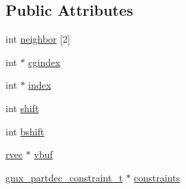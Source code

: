 \subsection*{\-Public \-Attributes}
\begin{DoxyCompactItemize}
\item 
int \hyperlink{structgmx__partdec_a5144dace85deda9f7d7708127c6b9063}{neighbor} \mbox{[}2\mbox{]}
\item 
int $\ast$ \hyperlink{structgmx__partdec_a8f29f682a9e86bca410b71805f7c8b4f}{cgindex}
\item 
int $\ast$ \hyperlink{structgmx__partdec_af9e7dc85b3d222e0ce03880ba697bd48}{index}
\item 
int \hyperlink{structgmx__partdec_a0b94a55d9edbfd4af09c9ee8b1e2f30f}{shift}
\item 
int \hyperlink{structgmx__partdec_aaad9cecf7002a5b6c07d308f392a6138}{bshift}
\item 
\hyperlink{share_2template_2gromacs_2types_2simple_8h_aa02a552a4abd2f180c282a083dc3a999}{rvec} $\ast$ \hyperlink{structgmx__partdec_a4236041be0410ec851935b6b0df5724d}{vbuf}
\item 
\hyperlink{partdec_8c_a17a4db74cddecc2b3f6070ed7f2b4aa1}{gmx\-\_\-partdec\-\_\-constraint\-\_\-t} $\ast$ \hyperlink{structgmx__partdec_af2acfdbfb831056bf04bface1f333c3a}{constraints}
\end{DoxyCompactItemize}


